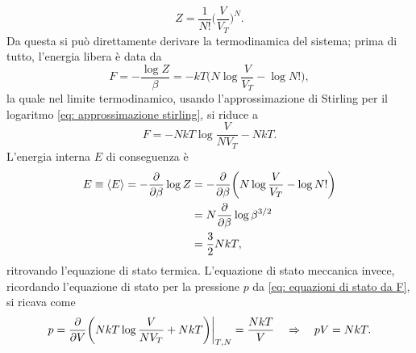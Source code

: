 \begin{equation}
\label{eq: funzione di partizione gas ideale (canonico)}
    Z = \frac{1}{N!}\bigg(\frac{V}{V_T}\bigg)^N.
\end{equation}
Da questa si può direttamente derivare la termodinamica del sistema; prima di tutto, l'energia libera è data da 
\begin{equation}
    F = -\frac{\log{Z}}{\beta} = -kT\bigg(N\log{\frac{V}{V_T}} - \log{N!}\bigg),
\end{equation}
la quale nel limite termodinamico, usando l'approssimazione di Stirling per il logaritmo \eqref{eq: approssimazione stirling}, si riduce a
\begin{equation}
    F = -NkT\log{\frac{V}{NV_T}} - NkT.
\end{equation}
L'energia interna $E$ di conseguenza è
\begin{equation}
    \begin{split}
        E \equiv \langle E \rangle = -\frac{\partial}{\partial\beta}\log{Z} &= -\frac{\partial}{\partial\beta}\bigg(N\log{\frac{V}{V_T}} - \log{N!}\bigg) \\
        &= N\frac{\partial}{\partial\beta}\log{\beta^{3/2}} \\
        &= \frac{3}{2}NkT,
    \end{split}
\end{equation}
ritrovando l'equazione di stato termica. L'equazione di stato meccanica invece, ricordando l'equazione di stato per la pressione $p$ da \eqref{eq: equazioni di stato da F}, si ricava come
\begin{equation}
    p = \frac{\partial}{\partial V}\bigg(NkT\log{\frac{V}{NV_T}} + NkT\bigg)\bigg|_{T,N} = \frac{NkT}{V}\quad\Rightarrow\quad pV = NkT.
\end{equation}

